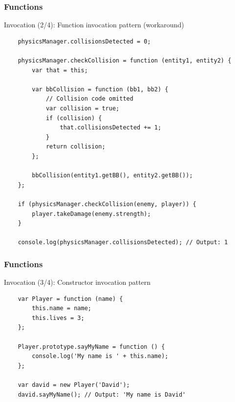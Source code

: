 \begin{frame}[fragile]
  \frametitle{Functions}

  \begin{block}{Invocation (2/4): Function invocation pattern (workaround)}
    {\scriptsize
    \begin{verbatim}
    physicsManager.collisionsDetected = 0;

    physicsManager.checkCollision = function (entity1, entity2) {
        var that = this;

        var bbCollision = function (bb1, bb2) {
            // Collision code omitted
            var collision = true;
            if (collision) {
                that.collisionsDetected += 1;
            }
            return collision;
        };

        bbCollision(entity1.getBB(), entity2.getBB());
    };

    if (physicsManager.checkCollision(enemy, player)) {
        player.takeDamage(enemy.strength);
    }

    console.log(physicsManager.collisionsDetected); // Output: 1
    \end{verbatim}
    }
  \end{block}
\end{frame}

\begin{frame}[fragile]
  \frametitle{Functions}

  \begin{block}{Invocation (3/4): Constructor invocation pattern}
    {\scriptsize
    \begin{verbatim}
    var Player = function (name) {
        this.name = name;
        this.lives = 3;
    };

    Player.prototype.sayMyName = function () {
        console.log('My name is ' + this.name);
    };

    var david = new Player('David');
    david.sayMyName(); // Output: 'My name is David'
    \end{verbatim}
    }
  \end{block}
\end{frame}

